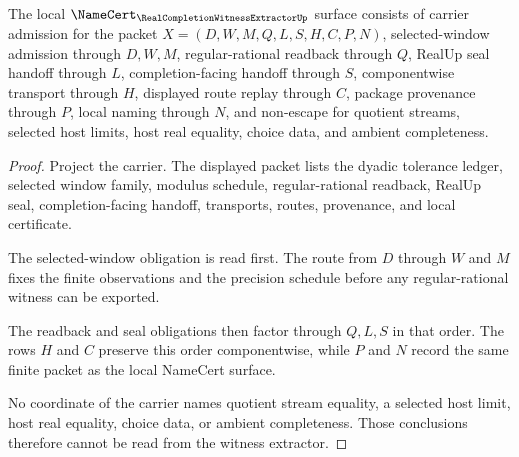 \begin{theorem}
\label{thm:real-completion-witness-extractor-namecert-obligations}
The local $\NameCert_{\RealCompletionWitnessExtractorUp}$ surface consists of
carrier admission for the packet $X=(D,W,M,Q,L,S,H,C,P,N)$, selected-window
admission through $D,W,M$, regular-rational readback through $Q$, RealUp seal
handoff through $L$, completion-facing handoff through $S$, componentwise
transport through $H$, displayed route replay through $C$, package provenance
through $P$, local naming through $N$, and non-escape for quotient streams,
selected host limits, host real equality, choice data, and ambient
completeness.
\end{theorem}
\begin{proof}
Project the carrier. The displayed packet lists the dyadic tolerance ledger,
selected window family, modulus schedule, regular-rational readback, RealUp
seal, completion-facing handoff, transports, routes, provenance, and local
certificate.

The selected-window obligation is read first. The route from $D$ through
$W$ and $M$ fixes the finite observations and the precision schedule before
any regular-rational witness can be exported.

The readback and seal obligations then factor through $Q,L,S$ in that order.
The rows $H$ and $C$ preserve this order componentwise, while $P$ and $N$
record the same finite packet as the local NameCert surface.

No coordinate of the carrier names quotient stream equality, a selected host
limit, host real equality, choice data, or ambient completeness. Those
conclusions therefore cannot be read from the witness extractor.
\end{proof}

